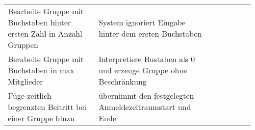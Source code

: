 \begin{table}[]
\begin{tabular}{p{6cm}p{7cm}p{3cm}llll}
		Bearbeite Gruppe mit Buchstaben hinter ersten Zahl in Anzahl Gruppen                                                                 & System ignoriert Eingabe hinter dem ersten Buchstaben                                                                                                           & \checkmark           &  &  &  \\
		Berabeite Gruppe mit Buchstaben in max Mitglieder                                                                                    & Interpretiere Bustaben als 0 und erzeuge Gruppe ohne Beschränkung                                                                                                & \checkmark           &  &  &  \\
		Füge zeitlich begrenzten Beitritt bei einer Gruppe hinzu                                                                              & übernimmt den festgelegten Anmeldezeitraumstart und Ende                                                                                                         & \checkmark           &  &  &  \\
	
		
	\end{tabular}
\end{table}

